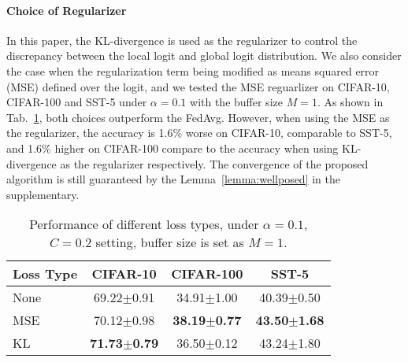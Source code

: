 \documentclass{article} %
\begin{document}
\paragraph{Choice of Regularizer}
In this paper, the KL-divergence is used as the regularizer to control the discrepancy between the local logit and global logit distribution. We also consider the case when the regularization term being modified as means squared error (MSE) defined over the logit, and we tested the MSE reguarlizer on CIFAR-10, CIFAR-100 and SST-5 under $\alpha=0.1$ with the buffer size $M=1$. As shown in  Tab.~\ref{tbl:loss_type}, both choices outperform the FedAvg. However, when using the MSE as the regularizer, the accuracy is 1.6\% worse on CIFAR-10, comparable to SST-5, and  1.6\% higher on CIFAR-100 compare to the accuracy when using KL-divergence as the regularizer respectively. 
The convergence of the proposed algorithm is still guaranteed by the Lemma~\ref{lemma:wellposed} in the supplementary. 
\begin{table}[h]
\centering
\small
\caption{Performance of different loss types, under $\alpha=0.1$, $C=0.2$ setting, buffer size is set as $M=1$.}
\setlength{\tabcolsep}{3pt} %
\begin{tabular}{lccc}
\hline
  Loss Type & CIFAR-10 &CIFAR-100 & SST-5\\
  \hline
    None & 69.22$\pm$0.91 & 34.91$\pm$1.00 & 40.39$\pm$0.50 \\ 
    MSE  & 70.12$\pm$0.98 & \bf{38.19$\pm$0.77} & \bf{43.50$\pm$1.68} \\
    KL & \bf{71.73$\pm$0.79} & 36.50$\pm$0.12 & 43.24$\pm$1.80 \\
    \bottomrule
  \end{tabular}
 
 \label{tbl:loss_type}
\end{table}


\end{document}
